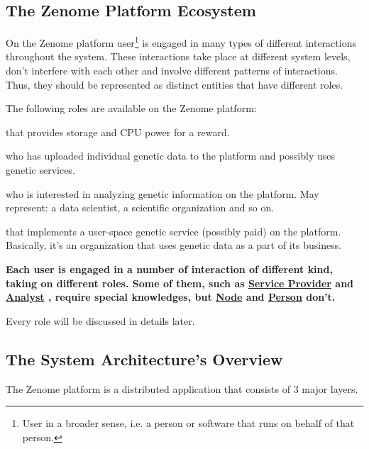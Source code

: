 \subsection{The Zenome Platform Ecosystem} %
On the Zenome platform user\footnote{User in a broader sense, i.e. a person or software that runs on behalf of that person.} is engaged in many types of different interactions throughout the system. These interactions take place at different system levels, don't interfere with each other and involve different patterns of interactions. Thus, they should be represented as distinct entities that have different roles.

The following roles are available on the Zenome platform:
\begin{description} \label{Roles}
  \item[(Calculating / Storing) Node]
    that provides storage and CPU power for a reward.
  \item[Person]
    who has uploaded individual genetic data to the platform and possibly uses genetic services.
  \item[Analyst]
    who is interested in analyzing genetic information on the platform. May represent: a data scientist, a scientific organization and so on.
  \item[Service Provider]
    that implements a user-space genetic service (possibly paid) on the platform. Basically, it's an organization that uses genetic data as a part of its business.
\end{description}

\def\ServiceProvider{\hyperref[Roles]{\textbf{Service Provider}} }
\def\Analyst{\hyperref[Roles]{\textbf{Analyst}} }
\def\Node{\hyperref[Roles]{\textbf{Node}} }
\def\Person{\hyperref[Roles]{\textbf{Person}} }

\begin{note}[IN SHORT] \bf
  Each user is engaged in a number of interaction of different kind, taking on different roles. Some of them, such as \ServiceProvider and \Analyst,  require special knowledges, but \Node and \Person don't.
\end{note}

Every role will be discussed in details later.

\subsection{The System Architecture's Overview} %
The Zenome platform is a distributed application that consists of 3 major layers.

